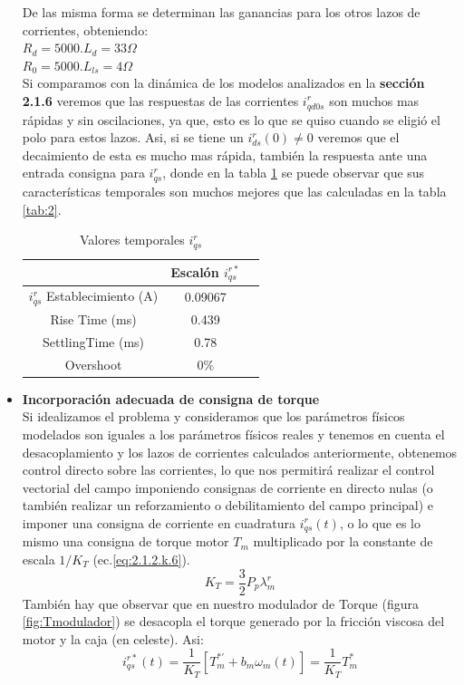 \documentclass[10pt]{article}
\begin{document}
\begin{itemize}
	De las misma forma se determinan las ganancias para los otros lazos de corrientes, obteniendo:\\
	$R_{d}=5000 . L_{d}=33\Omega$\\
	$R_{0}=5000 . L_{ls}=4\Omega$\\
	Si comparamos con la dinámica de los modelos analizados en la \textbf{sección 2.1.6} veremos que las respuestas de las corrientes $i^{r}_{qd0s}$ son muchos mas rápidas y sin oscilaciones, ya que, esto es lo que se quiso cuando se eligió el polo para estos lazos. Asi, si se tiene un $i^{r}_{ds}(0)\neq 0$ veremos que el decaimiento de esta es mucho mas rápida, también la respuesta ante una entrada consigna para $i^{r}_{qs}$, donde en la tabla \ref{tab:3} se puede observar que sus características temporales son muchos mejores que las calculadas en la tabla \ref{tab:2}.
		\begin{table}[!h]
	\begin{center}
	\begin{tabular}{| c | c | c | }
	\hline
	  & Escalón $i^{r*}_{qs}$\\ \hline
	 $ i^{r}_{qs}$ Establecimiento (A) &   0.09067 \\ \hline
	 Rise Time (ms) &  0.439\\ \hline
	SettlingTime (ms)& 0.78\\ \hline
	Overshoot &0$\%$ \\ \hline
	\end{tabular}
	\caption{Valores temporales $i^{r}_{qs}$}
	\label{tab:3}
	\end{center}
	\end{table}
	
\item \textbf{Incorporación adecuada de consigna de torque}\\
Si idealizamos el problema y consideramos que los parámetros físicos modelados son iguales a los parámetros físicos reales y tenemos en cuenta el desacoplamiento y los lazos de corrientes calculados anteriormente, obtenemos control directo sobre las corrientes, lo que nos permitirá realizar el control vectorial del campo imponiendo consignas de corriente en directo nulas (o también realizar un reforzamiento o debilitamiento del campo principal) e imponer una consigna de corriente en cuadratura $i^{r}_{qs}(t)$, o  lo que es lo mismo una consigna de torque motor $T_{m}$ multiplicado por la constante de escala $1/K_{T}$ (ec.\ref{eq:2.1.2.k.6}).
		\begin{equation}
	K_{T}=\frac{3}{2}P_{p}\lambda^{r}_{m}
	\label{eq:2.1.2.k.6}
	\end{equation}
	También hay que observar que en nuestro modulador de Torque (figura \ref{fig:Tmodulador}) se desacopla el torque generado por la fricción viscosa del motor y la caja (en celeste). Asi:
			\begin{equation}
	i^{r*}_{qs}(t)=\frac{1}{K_{T}}[T^{*'}_{m}+b_{m}\omega_{m}(t)]=\frac{1}{K_{T}}T^{*}_{m}
	\label{eq:2.1.2.k.7}
	\end{equation}
	

\end{itemize}
\end{document}
